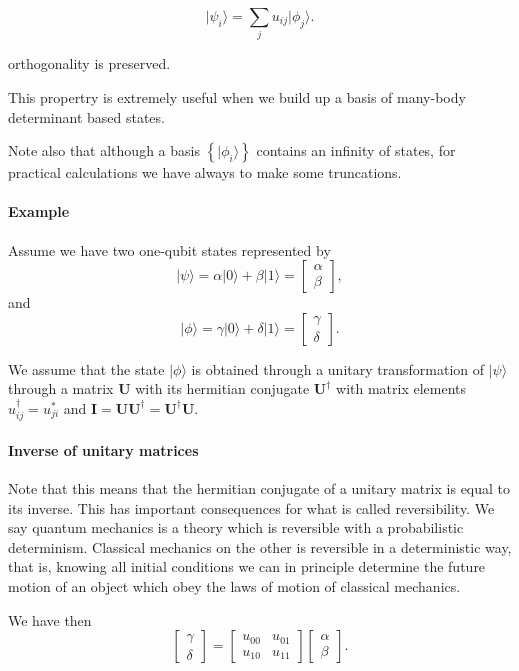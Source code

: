 \[
\vert \psi_i\rangle = \sum_{j} u_{ij}\vert \phi_{j}\rangle.
\]

orthogonality is preserved.

This propertry is extremely useful when we build up a basis of
many-body determinant based states.

Note also that although a basis $\left\{\vert \phi_i \rangle\right\}$ contains an infinity of states, for practical calculations we have always to make some truncations.


\paragraph{Example}

Assume we have two one-qubit states represented by
\[
\vert \psi \rangle = \alpha \vert 0 \rangle + \beta \vert 1\rangle=\begin{bmatrix}\alpha \\ \beta \end{bmatrix},
\]
and
\[
\vert \phi \rangle = \gamma \vert 0 \rangle + \delta \vert 1\rangle=\begin{bmatrix}\gamma \\ \delta \end{bmatrix}.
\]

We assume that the state $\vert \phi \rangle$ is obtained through a
unitary transformation of $\vert \psi \rangle$ through a matrix
$\bm{U}$ with its hermitian conjugate $\bm{U}^{\dagger}$ with matrix
elements $u_{ij}^{\dagger}=u_{ji}^*$ and
$\bm{I}=\bm{U}\bm{U}^{\dagger}=\bm{U}^{\dagger}\bm{U}$.


\paragraph{Inverse of unitary matrices}

Note that this means that the hermitian conjugate of a unitary matrix
is equal to its inverse. This has important consequences for what is
called reversibility. We say quantum mechanics is a theory which is
reversible with a probabilistic determinism. Classical mechanics on
the other is reversible in a deterministic way, that is, knowing all
initial conditions we can in principle determine the future motion of
an object which obey the laws of motion of classical mechanics.

We have then
\[
\begin{bmatrix}\gamma \\ \delta \end{bmatrix}=\begin{bmatrix}u_{00} & u_{01} \\ u_{10} & u_{11} \end{bmatrix}\begin{bmatrix}\alpha \\ \beta \end{bmatrix}.
\]


